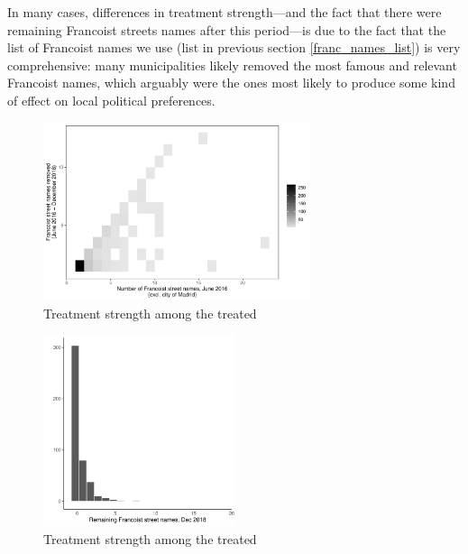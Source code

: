 \documentclass[12pt, titlepage]{article}
\begin{document}
In many cases, differences in treatment strength---and the fact that there were remaining Francoist streets names after this period---is due to the fact that the list of Francoist names we use (list in previous section \ref{franc_names_list}) is very comprehensive: many municipalities likely removed the most famous and relevant Francoist names, which arguably were the ones most likely to produce some kind of effect on local political preferences.

\begin{figure}[htb!]
\centering

  \includegraphics[width = 0.7\textwidth]{img/trt_strength_st2016}

  \caption{Treatment strength among the treated}\label{fig:trt_strength_st2016}

\end{figure}

\begin{figure}[htb!]
\centering

  \includegraphics[width = 0.5\textwidth]{img/trt_remaining}

  \caption{Treatment strength among the treated}\label{fig:trt_remaining}

\end{figure}
\end{document}
